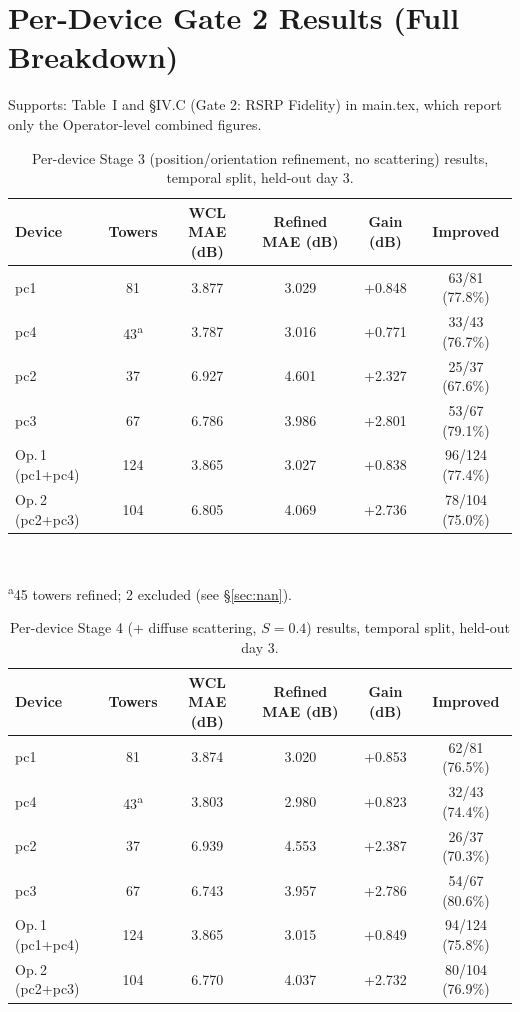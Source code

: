 \documentclass[11pt]{article}
\begin{document}
\section{Per-Device Gate 2 Results (Full Breakdown)}
\label{sec:perdevice}

Supports: Table~I and \S IV.C (Gate 2: RSRP Fidelity) in main.tex, which
report only the Operator-level combined figures.

\begin{table}[h]
\centering
\caption{Per-device Stage 3 (position/orientation refinement, no
scattering) results, temporal split, held-out day 3.}
\small
\begin{tabular}{lccccc}
\toprule
Device & Towers & WCL MAE (dB) & Refined MAE (dB) & Gain (dB) & Improved \\
\midrule
pc1 & 81  & 3.877 & 3.029 & +0.848 & 63/81 (77.8\%) \\
pc4 & 43\textsuperscript{a} & 3.787 & 3.016 & +0.771 & 33/43 (76.7\%) \\
pc2 & 37  & 6.927 & 4.601 & +2.327 & 25/37 (67.6\%) \\
pc3 & 67  & 6.786 & 3.986 & +2.801 & 53/67 (79.1\%) \\
\midrule
Op.\,1 (pc1+pc4) & 124 & 3.865 & 3.027 & +0.838 & 96/124 (77.4\%) \\
Op.\,2 (pc2+pc3) & 104 & 6.805 & 4.069 & +2.736 & 78/104 (75.0\%) \\
\bottomrule
\end{tabular}\\[2mm]
\raggedright\footnotesize\textsuperscript{a}45 towers refined; 2 excluded
(see \S\ref{sec:nan}).
\end{table}

\begin{table}[h]
\centering
\caption{Per-device Stage 4 (+ diffuse scattering, $S=0.4$) results,
temporal split, held-out day 3.}
\small
\begin{tabular}{lccccc}
\toprule
Device & Towers & WCL MAE (dB) & Refined MAE (dB) & Gain (dB) & Improved \\
\midrule
pc1 & 81  & 3.874 & 3.020 & +0.853 & 62/81 (76.5\%) \\
pc4 & 43\textsuperscript{a} & 3.803 & 2.980 & +0.823 & 32/43 (74.4\%) \\
pc2 & 37  & 6.939 & 4.553 & +2.387 & 26/37 (70.3\%) \\
pc3 & 67  & 6.743 & 3.957 & +2.786 & 54/67 (80.6\%) \\
\midrule
Op.\,1 (pc1+pc4) & 124 & 3.865 & 3.015 & +0.849 & 94/124 (75.8\%) \\
Op.\,2 (pc2+pc3) & 104 & 6.770 & 4.037 & +2.732 & 80/104 (76.9\%) \\
\bottomrule
\end{tabular}
\end{table}
\end{document}
